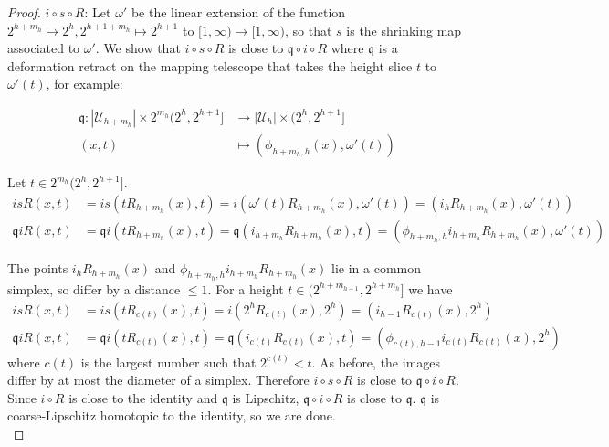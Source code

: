 \documentclass[a4paper,11pt]{article}
\theoremstyle{definition}
\theoremstyle{plain}
\theoremstyle{remark}
\begin{document}
{\begin{proof}
$i \circ s \circ R$: %
Let $\omega'$ be the linear extension of the function $2^{h+m_{h}}\mapsto 2^{h}, 2^{h+1+m_{h}}\mapsto 2^{h+1}$ to $[1, \infty)\rightarrow [1,\infty)$, so that $s$ is the shrinking map associated to $\omega'$. We show that $i \circ s \circ R$ is close to $\mathfrak{q}\circ i \circ R$ where $\mathfrak{q}$ is a deformation retract on the mapping telescope that takes the height slice $t$ to $\omega'(t)$, for example:

\begin{align*}
\mathfrak{q}: |\mathcal{U}_{h+m_{h}}|\times 2^{m_{h}} (2^h,2^{h+1}]&\rightarrow  |\mathcal{U}_{h}| \times (2^{h},2^{h+1}]\\
(x,t)&\mapsto (\phi_{h+m_{h},h}(x), \omega'(t))
\end{align*}

Let $t\in 2^{m_h}(2^h,2^{h+1}]$. 
\begin{align*}
i s R (x,t) &= i s (t R_{h+m_{h}}(x), t) = i (\omega'(t) R_{h+m_{h}}(x), \omega'(t)) = (i_{h} R_{h+m_{h}}(x), \omega'(t))\\
\mathfrak{q}  i  R (x,t) &= \mathfrak{q} i (tR_{h+m_{h}}(x), t) = \mathfrak{q}(i_{h+m_{h}} R_{h+m_{h}}(x),t) = (\phi_{h+m_h, h}i_{h+m_{h}} R_{h+m_{h}}(x), \omega'(t))
\end{align*}

The points $i_{h}R_{h+m_{h}}(x)$ and $\phi_{h+m_h, h}i_{h+m_{h}}R_{h+m_{h}}(x)$ lie in a common simplex, so differ by a distance $\leq 1$. For a height $t\in(2^{h+m_{h-1}}, 2^{h+m_{h}}]$ we have 
\begin{align*}
i s R (x,t) &= i s (t R_{c(t)}(x), t) = i (2^h R_{c(t)}(x),2^h) = (i_{h-1} R_{c(t)}(x), 2^h)\\
\mathfrak{q}  i  R (x,t) &= \mathfrak{q} i (tR_{c(t)}(x), t) = \mathfrak{q}(i_{c(t)} R_{c(t)}(x),t) = (\phi_{c(t), h-1}i_{c(t)} R_{c(t)}(x), 2^h)
\end{align*}
where $c(t)$ is the largest number such that $2^{c(t)}<t$. As before, the images differ by at most the diameter of a simplex. Therefore $i \circ s\circ R$ is close to $\mathfrak{q} \circ i\circ R$. Since $i\circ R$ is close to the identity and $\mathfrak{q}$ is Lipschitz, $\mathfrak{q}\circ i\circ R$ is close to $\mathfrak{q}$. $\mathfrak{q}$ is coarse-Lipschitz homotopic to the identity, so we are done. \\
\end{proof}


}
\end{document}
